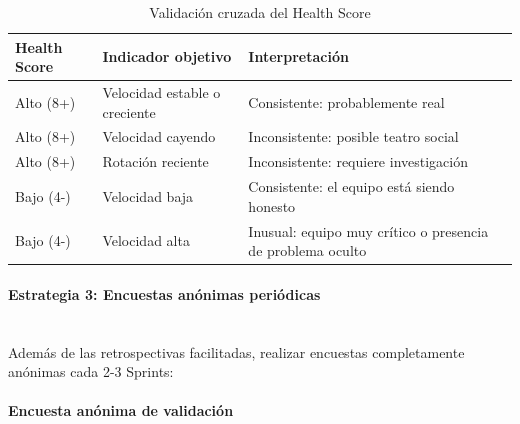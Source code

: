 \begin{table}[h]
    \centering
    \small
    \begin{tabularx}{\textwidth}{|l|l|X|}
        \hline
        \textbf{Health Score} & \textbf{Indicador objetivo}                                & \textbf{Interpretación} \\
        \hline
        Alto (8+)
                              & Velocidad estable o creciente
                              & Consistente: probablemente real                                                      \\
        \hline
        Alto (8+)
                              & Velocidad cayendo
                              & Inconsistente: posible teatro social                                                 \\
        \hline
        Alto (8+)
                              & Rotación reciente
                              & Inconsistente: requiere investigación                                                \\
        \hline
        Bajo (4-)
                              & Velocidad baja
                              & Consistente: el equipo está siendo honesto                                           \\
        \hline
        Bajo (4-)
                              & Velocidad alta
                              & Inusual: equipo muy crítico o presencia de problema oculto                           \\
        \hline
    \end{tabularx}
    \caption{Validación cruzada del Health Score}
    \label{tab:validacion-cruzada}
\end{table}
\FloatBarrier

\paragraph{Estrategia 3: Encuestas anónimas periódicas}\mbox{}\\[-0.3\baselineskip]

Además de las retrospectivas facilitadas, realizar encuestas completamente anónimas cada 2-3 Sprints:

\paragraph{Encuesta anónima de validación}\mbox{}\\[-0.3\baselineskip]

